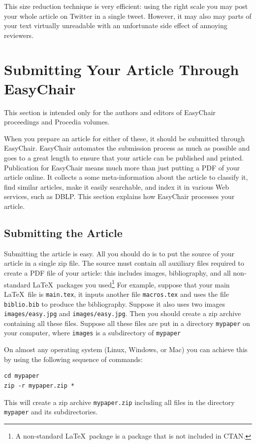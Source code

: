 \documentclass[EPiC]{easychair}
\begin{document}
This size reduction technique is very efficient: using the right scale
you may post your whole article on Twitter in a single tweet. However,
it may also may parts of your text virtually unreadable with an
unfortunate side effect of annoying reviewers. 

\section{Submitting Your Article Through EasyChair}

This section is intended only for the authors and editors of EasyChair
proceedings and Procedia volumes. 

When you prepare an article for either of these, it should be
submitted through EasyChair. EasyChair automates the submission
process as much as possible and goes to a great length to ensure that
your article can be published and printed. Publication for EasyChair
means much more than just putting a PDF of your article online. It
collects a some meta-information about the article to classify it,
find similar articles, make it easily searchable, and index it in
various Web services, such as DBLP. This section explains how
EasyChair processes your article. 

\subsection{Submitting the Article}

Submitting the article is easy. All you should do is to put the source
of your article in a single zip file. The source must contain all
auxiliary files required to create a PDF file of your article: this
includes images, bibliography, and all non-standard \LaTeX\ packages
you used\footnote{ 
  A non-standard \LaTeX\ package is a package that is not included in
  CTAN. 
} For example, suppose that your main \LaTeX\ file is
\texttt{main.tex}, it inputs another file \texttt{macros.tex} and uses
the file \texttt{biblio.bib} to produce the bibliography. Suppose it
also uses two images \texttt{images/easy.jpg} and
\texttt{images/easy.jpg}. Then you should create a zip archive
containing all these files. Suppose all these files are put in a
directory \texttt{mypaper} on your computer, where \texttt{images} is
a subdirectory of \texttt{mypaper}

On almost any operating system (Linux,
Windows, or Mac) you can achieve this by using the following sequence
of commands:

\begin{verbatim}
cd mypaper
zip -r mypaper.zip *
\end{verbatim}
This will create a zip archive \texttt{mypaper.zip} including all
files in the directory \texttt{mypaper} and its subdirectories. 
\end{document}
